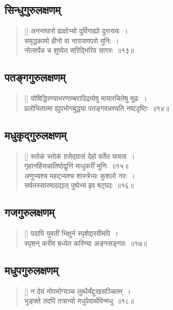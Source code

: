 \documentclass[twoside,12pt,notitlepage]{book}
\begin{document}
\subsection*{सिन्धुगुरुलक्षणम् }
\begin{verse}[\versewidth]
अनन्तपारो ह्यक्षोभ्यो दुर्विगाह्यो दुरत्ययः~।\\[-6pt]
समृद्धकामो हीनो  वा नारायणपरो मुनिः~।\\[-6pt]
नोत्सर्पेन्न च शुष्येत सरिद्भिरिव सागरः~॥१३॥\footA 
\end{verse}

\subsection*{पतङ्गगुरुलक्षणम्}
\begin{verse}[\versewidth]
योषिद्धिरण्याभरणाम्बरादिद्रव्येषु मायारचितेषु मूढः~।\\[-6pt]
प्रलोभितात्मा ह्युपभोगबुद्ध्या पतङ्गवन्नश्यति नष्टदृष्टिः~॥१४॥\footA 
\end{verse}

\subsection*{मधुकृद्‌गुरुलक्षणम्}
\begin{verse}[\versewidth]
स्तोकं स्तोकं ग्रसेद्ग्रासं देहो वर्तेत यावता~।\\[-6pt]
गृहानहिंसन्नातिष्ठेद्वृत्तिं माधुकरीं मुनिः~॥१५॥\\
अणुभ्यश्च महद्भ्यश्च शास्त्रेभ्यः कुशलो नरः~।\\[-6pt]
सर्वतस्सारमादद्यात् पुष्पेभ्य इव षट्पदः~॥१६॥\footA 
\end{verse}


\subsection*{गजगुरुलक्षणम्}
\begin{verse}[\versewidth]
पदापि युवतीं भिक्षुर्न स्पृशेद्दारवीमपि~।\\[-6pt]
स्पृशन् करीव बध्येत करिण्या अङ्गसङ्गतः~॥१७॥\footA 
\end{verse}

\subsection*{मधुपगुरुलक्षणम्}
\begin{verse}[\versewidth]
न देयं नोपभोग्यञ्च लुब्धैर्यंद्दुःखसञ्चितम्~।\\[-6pt]
भुङ्क्ते तदपि तत्रान्यो मधुपेवार्थविन्मधु~॥१८॥\footA 
\end{verse}
\end{document}
